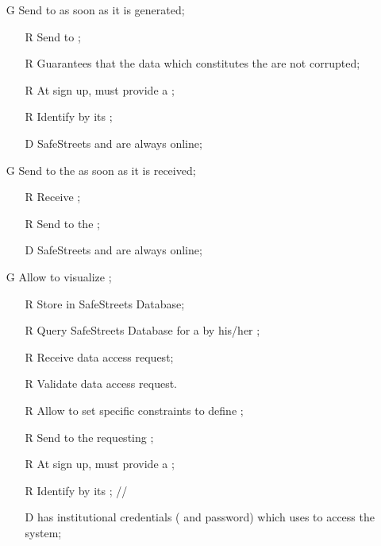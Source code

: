 \documentclass[../../../rasd.tex]{subfiles}
\begin{document}
\begin{itemize}
	\item[G\subs{2}]Send  to  as soon as it is generated;
	\begin{itemize}
		\item[R\subs{11}]Send  to ;
		\item[R\subs{15}]Guarantees that the data which constitutes the  are not corrupted;
		\item[R\subs{31}]At sign up,  must provide a ;
		\item[R\subs{32}]Identify  by its ;
		\\
		\item[D\subs{6}]SafeStreets and  are always online;	
	\end{itemize}

	\item[G\subs{3}]Send  to the  as soon as it is received;
	\begin{itemize}
		\item[R\subs{4}]Receive ;
		\item[R\subs{7}]Send  to the ;
		\\
		\item[D\subs{6}]SafeStreets and  are always online;
	\end{itemize}

	\item[G\subs{4}]Allow  to visualize ;
	\begin{itemize}
		\item[R\subs{10}]Store  in SafeStreets Database;
		\item[R\subs{13}]Query SafeStreets Database for a  by his/her ;
		\item[R\subs{16}]Receive  data access request;
		\item[R\subs{17}]Validate  data access request.
		\item[R\subs{18}]Allow  to set specific constraints to define ;
		\item[R\subs{19}]Send  to the requesting ;
		\item[R\subs{31}]At sign up,  must provide a ;
		\item[R\subs{32}]Identify  by its ;
		//
		\item[D\subs{9}] has institutional credentials ( and password) which uses to access the system;
	\end{itemize}


\end{itemize}
\end{document}
